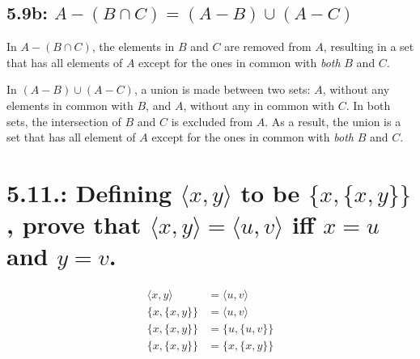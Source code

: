 \documentclass{article}
\begin{document}
\subsection*{5.9b: $A-(B\cap C)=(A-B)\cup(A-C)$}
In $A-(B\cap C)$, the elements in $B$ and $C$ are removed from $A$, resulting in a set that has all elements of $A$ except for the ones in common with \textit{both} $B$ and $C$.

In $(A-B)\cup(A-C)$, a union is made between two sets: $A$, without any elements in common with $B$, and $A$, without any in common with $C$. In both sets, the intersection of $B$ and $C$ is excluded from $A$. As a result, the union is a set that has all element of $A$ except for the ones in common with \textit{both} $B$ and $C$.
\section*{5.11.: Defining $\langle x,y\rangle$ to be $\{x,\{x,y\}\}$, prove that $\langle x,y\rangle=\langle u,v\rangle$ iff $x=u$ and $y=v$.}
\begin{align*}
  \langle x,y\rangle&=\langle u,v\rangle\\
  \{x,\{x,y\}\}&=\langle u,v\rangle\\
  \{x,\{x,y\}\}&=\{u,\{u,v\}\}\\
  \{x,\{x,y\}\}&=\{x,\{x,y\}\}
\end{align*}
\end{document}
